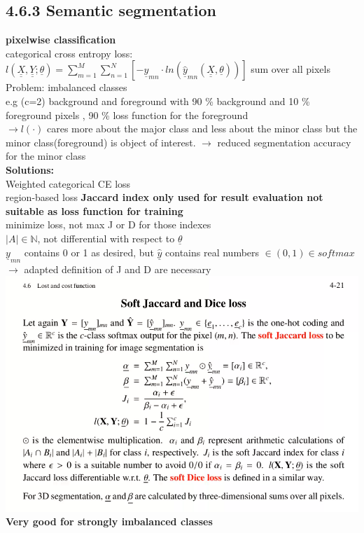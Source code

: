 \subsection{4.6.3 Semantic segmentation }
\textbf{pixelwise classification }\\
categorical cross entropy loss: \\
$  l(\underline{\underline{X}} , \underline{\underline{Y}}; \underline{\theta}) = \sum_{m=1}^{M} \sum_{n=1}^{N}[- \underline{y}_{mn} \cdot ln (\hat{\underline{y}}_{mn} ( \underline{\underline{X}}, \underline{\theta} )) ] $
sum over all pixels\\
Problem: imbalanced classes \\
e.g (c=2) background and foreground with 90 \% background and 10 \% foreground pixels , 90 \% loss function for the foreground \\
$\rightarrow l(\cdot)$ cares more about the major class and less about the minor class but the minor class(foreground) is object of interest. 
$\rightarrow$ reduced segmentation accuracy for the minor class \\
\textbf{Solutions:} \\
\textbullet Weighted categorical CE loss \\
\textbullet region-based loss 
\textbf{Jaccard index only used for result evaluation not suitable as loss function for training}\\
\textbullet minimize loss, not max J or D for those indexes\\
\textbullet $ |A|  \in \mathds{N}$, not differential with respect to $ \underline{\theta} $\\
\textbullet $ \underline{y}_{mn} $ contains 0 or 1 as desired, but $ \hat{\underline{y}}  $ contains real numbers $ \in (0,1) \in softmax $ \\
$\rightarrow$ adapted definition of J and D are necessary \\
\includegraphics[width=\linewidth]{Images/SoftJaccardDiceLoss.png}\\
\textbf{Very good for strongly imbalanced classes }
